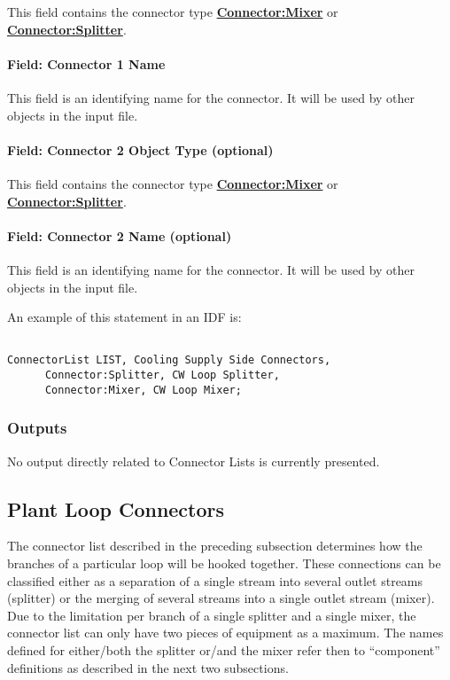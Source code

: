 This field contains the connector type \textbf{\hyperref[connectormixer]{Connector:Mixer}} or \textbf{\hyperref[connectorsplitter]{Connector:Splitter}}.

\paragraph{Field: Connector 1 Name}\label{field-connector-1-name}

This field is an identifying name for the connector. It will be used by other objects in the input file.

\paragraph{Field: Connector 2 Object Type (optional)}\label{field-connector-2-object-type-optional}

This field contains the connector type \textbf{\hyperref[connectormixer]{Connector:Mixer}} or \textbf{\hyperref[connectorsplitter]{Connector:Splitter}}.

\paragraph{Field: Connector 2 Name (optional)}\label{field-connector-2-name-optional}

This field is an identifying name for the connector. It will be used by other objects in the input file.

An example of this statement in an IDF is:

\begin{lstlisting}

ConnectorList LIST, Cooling Supply Side Connectors,
      Connector:Splitter, CW Loop Splitter,
      Connector:Mixer, CW Loop Mixer;
\end{lstlisting}

\subsubsection{Outputs}\label{outputs-3-012}

No output directly related to Connector Lists is currently presented.

\subsection{Plant Loop Connectors}\label{plant-loop-connectors}

The connector list described in the preceding subsection determines how the branches of a particular loop will be hooked together. These connections can be classified either as a separation of a single stream into several outlet streams (splitter) or the merging of several streams into a single outlet stream (mixer). Due to the limitation per branch of a single splitter and a single mixer, the connector list can only have two pieces of equipment as a maximum. The names defined for either/both the splitter or/and the mixer refer then to ``component'' definitions as described in the next two subsections.

